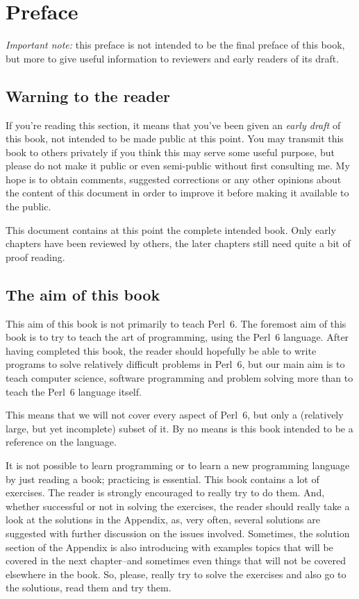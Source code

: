 
\chapter{Preface}

\emph{Important note:} this preface is not intended to be the 
final preface of this book, but more to give useful information 
to reviewers and early readers of its draft.

\section*{Warning to the reader}

If you're reading this section, it means that you've been 
given an \emph{early draft} of this book, not 
intended to be made public at this point. You may transmit 
this book to others privately if you think this may serve 
some useful purpose, but please do not make 
it public or even semi-public without first consulting 
me. My hope is to obtain comments, suggested corrections or 
any other opinions about the content of this document in 
order to improve it before making it available to the 
public.

This document contains at this point the complete intended 
book. Only early chapters have been reviewed by others, the 
later chapters still need quite a bit of proof reading.

\section*{The aim of this book}

This aim of this book is not primarily to teach Perl~6. 
The foremost aim of this book is to try to teach the art 
of programming, using the Perl~6 language. After having 
completed this book, the reader should hopefully be able 
to write programs to solve relatively difficult problems in 
Perl~6, but our main aim is to teach computer science, software 
programming and problem solving more than to teach the Perl~6 
language itself. 

This means that we will not cover every aspect of Perl~6, but 
only a (relatively large, but yet incomplete) subset of it. 
By no means is this book intended to be a reference on the 
language.

It is not possible to learn programming or to learn a new 
programming language by just reading a book; practicing 
is essential. This book contains a lot of exercises. The 
reader is strongly encouraged to really try to do them. And, 
whether successful or not in solving the exercises, the reader 
should really take a look at the solutions in the Appendix, 
as, very often, several solutions are suggested with further 
discussion on the issues involved. Sometimes, the solution 
section of the Appendix is also introducing with examples topics 
that will be covered in the next chapter--and sometimes even 
things that will not be covered elsewhere in the book. So, 
please, really try to solve the exercises and also go to 
the solutions, read them and try them.

